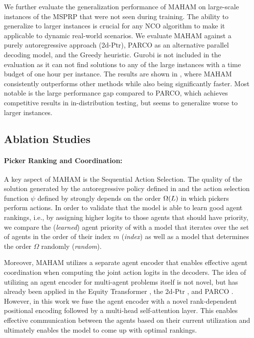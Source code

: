 We further evaluate the generalization performance of MAHAM on large-scale instances of the MSPRP that were not seen during training. The ability to generalize to larger instances is crucial for any NCO algorithm to make it applicable to dynamic real-world scenarios. We evaluate MAHAM against a purely autoregressive approach (2d-Ptr), PARCO as an alternative parallel decoding model, and the Greedy heuristic. Gurobi is not included in the evaluation as it can not find solutions to any of the large instances with a time budget of one hour per instance. The results are shown in , where MAHAM consistently outperforms other methods while also being significantly faster. Most notable is the large performance gap compared to PARCO, which achieves competitive results in in-distribution testing, but seems to generalize worse to larger instances.

\subsection{Ablation Studies}

\paragraph{Picker Ranking and Coordination:}
A key aspect of MAHAM is the Sequential Action Selection. The quality of the solution generated by the autoregressive policy defined in  and the action selection function $\psi$ defined by  strongly depends on the order ${\Omega(L)}$ in which pickers perform actions. In order to validate that the model is able to learn good agent rankings, i.e., by assigning higher logits to those agents that should have priority, we compare the (\textit{learned}) agent priority of  with a model that iterates over the set of agents in the order of their index $m$ (\textit{index}) as well as a model that determines the order $\Omega$ randomly (\textit{random}). 

Moreover, MAHAM utilizes a separate agent encoder that enables effective agent coordination when computing the joint action logits in the decoders. The idea of utilizing an agent encoder for multi-agent problems itself is not novel, but has already been applied in the Equity Transformer \cite{son2024equity}, the 2d-Ptr \cite{liu20242d}, and PARCO \cite{berto2024parco}. However, in this work we fuse the agent encoder with a novel rank-dependent positional encoding followed by a multi-head self-attention layer. This enables effective communication between the agents based on their current utilization and ultimately enables the model to come up with optimal rankings. 

